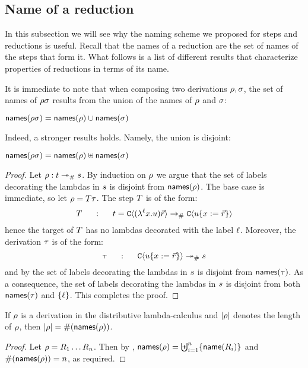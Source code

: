 \subsection*{Name of a reduction}

In this subsection we will see why the naming scheme we proposed for steps and
reductions is useful. Recall that the names of a reduction are the set of names of the steps that form it.
What follows is a list of different results that characterize properties
of reductions in terms of its name.

It is immediate to note that
when composing two derivations $\rho, \sigma$,
the set of names of $\rho\sigma$
results from the union of the names of $\rho$ and $\sigma$:

\begin{remark}
$\mathsf{names}(\rho\sigma) = \mathsf{names}(\rho) \cup \mathsf{names}(\sigma)$
\end{remark}

Indeed, a stronger results holds. Namely, the union is disjoint:

\begin{lemma}
$\mathsf{names}(\rho\sigma) = \mathsf{names}(\rho) \uplus \mathsf{names}(\sigma)$
\end{lemma}
\begin{proof}
Let $\rho : t \mathrel{\twoheadrightarrow_{\mathtt{\#}}} s$.
By induction on $\rho$ we argue that the set of labels decorating the lambdas in $s$
is disjoint from $\mathsf{names}(\rho)$.
The base case is immediate, so let $\rho = T\tau$.
The step $T$ is of the form:
\[
  T \hspace{.5cm}:\hspace{.5cm}
  t =
  \mathtt{C}\langle(\lambda^{\ell} x. u)\vec{r}\rangle
  \mathrel{\to_{\mathtt{\#}}}
  \mathtt{C}\langle u\{x := \vec{r}\}\rangle
\]
hence the target of $T$ has no lambdas decorated with the label $\ell$.
Moreover, the derivation $\tau$ is of the form:
\[
  \tau \hspace{.5cm}:\hspace{.5cm}
  \mathtt{C}\langle u\{x := \vec{r}\}\rangle
  \mathrel{\twoheadrightarrow_{\mathtt{\#}}}
  s
\]
and by \ih the set of labels decorating the lambdas in $s$
is disjoint from $\mathsf{names}(\tau)$.
As a consequence,
the set of labels decorating the lambdas in $s$
is disjoint from both $\mathsf{names}(\tau)$
and $\{\ell\}$.
This completes the proof.
\end{proof}

\begin{corollary}
If $\rho$ is a derivation in the distributive lambda-calculus
and $|\rho|$ denotes the length of $\rho$,
then
$|\rho| = \#(\mathsf{names}(\rho))$.
\end{corollary}
\begin{proof}
Let $\rho = R_1\hdots R_n$.
Then by ,
$\mathsf{names}(\rho) = \biguplus_{i=1}^{n} \{\mathsf{name}(R_i)\}$
and
$\#(\mathsf{names}(\rho)) = n$, as required.
\end{proof}

